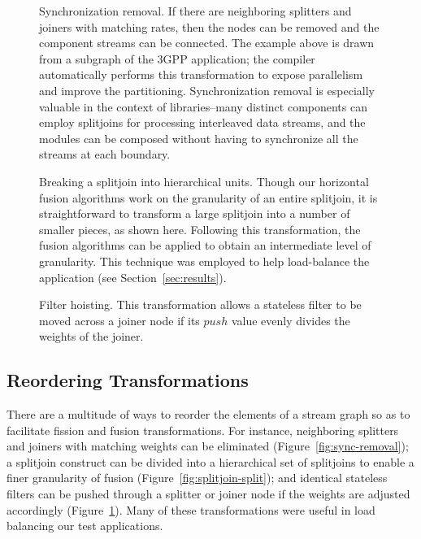 \begin{figure}
\centering
{}
\caption{\protect\small Synchronization removal.  If there are
neighboring splitters and joiners with matching rates, then the nodes
can be removed and the component streams can be connected.  The
example above is drawn from a subgraph of the 3GPP application; the
compiler automatically performs this transformation to expose
parallelism and improve the partitioning.  Synchronization removal
is especially valuable in the context of libraries--many distinct
components can employ splitjoins for processing interleaved data
streams, and the modules can be composed without having to synchronize
all the streams at each boundary.  \protect\label{fig:sync-removal}}
\vspace{24pt}
\caption{\protect\small Breaking a splitjoin into hierarchical units.
Though our horizontal fusion algorithms work on the granularity of an
entire splitjoin, it is straightforward to transform a large splitjoin
into a number of smaller pieces, as shown here.  Following this
transformation, the fusion algorithms can be applied to obtain an
intermediate level of granularity.  This technique was employed to
help load-balance the \Radar~ application (see Section~\ref{sec:results}).
\protect\label{fig:splitjoin-split}} 
\vspace{24pt}
\caption{\protect\small Filter hoisting.  This transformation allows a
stateless filter to be moved across a joiner node if its $push$ value
evenly divides the weights of the joiner.
\protect\label{fig:filter-hoisting}}
\vspace{-12pt}
\end{figure}

\subsection{Reordering Transformations}

There are a multitude of ways to reorder the elements of a stream
graph so as to facilitate fission and fusion transformations.  For
instance, neighboring splitters and joiners with matching weights can
be eliminated (Figure~\ref{fig:sync-removal}); a splitjoin construct
can be divided into a hierarchical set of splitjoins to enable a finer
granularity of fusion (Figure~\ref{fig:splitjoin-split}); and
identical stateless filters can be pushed through a splitter or joiner
node if the weights are adjusted accordingly
(Figure~\ref{fig:filter-hoisting}).  Many of these transformations
were useful in load balancing our test applications.

